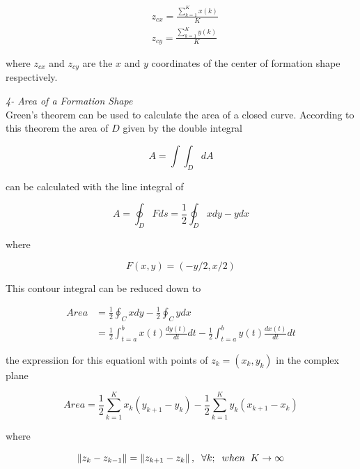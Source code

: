 \begin{align*}
&z_{cx} = \frac{\sum_{k=1}^{K}x(k)}{K}  \\
&z_{cy} = \frac{\sum_{k=1}^{K}y(k)}{K}  
\end{align*}
		
where $z_{cx}$ and $z_{cy}$ are the $x$ and $y$ coordinates of the center of formation shape respectively.

\textit{ 	4- Area of a Formation Shape} \\ 		
Green's theorem can be used to calculate the area of a closed curve. According to this theorem the area of $D$ given by the double integral

\begin{equation}
 A = \int\int_D dA
\end{equation}
		
can be calculated with the line integral of

\begin{equation}
 A = \oint_D F ds = \frac{1}{2} \oint_D xdy - ydx
\end{equation}

where

\begin{equation}
F(x,y) = (-y/2,x/2)
\end{equation}
		
This contour integral can be reduced down to

\begin{align*}
Area &= \frac{1}{2} \oint_C xdy - \frac{1}{2} \oint_C ydx \\
&= \frac{1}{2} \int_{t=a}^{b} x(t)\frac{dy(t)}{dt}dt - \frac{1}{2} \int_{t=a}^{b}y(t)\frac{dx(t)}{dt}dt
\end{align*}
		
the expressiion for this equationl with points of  $z_k = (x_k,y_k)$ in the complex plane
			
\begin{equation}
Area = \frac{1}{2} \sum_{k=1}^{K} x_k(y_{k+1} - y_k) - \frac{1}{2} \sum_{k=1}^{K}y_k(x_{k+1} - x_k)
\end{equation}
			
where

\begin{equation}
\left\lVert z_k - z_{k-1}\right\rVert = \left\lVert z_{k+1} - z_k\right\rVert, \hspace{0.2cm}  \forall k ;  \hspace{0.2cm} when  \hspace{0.2cm} K \to\infty
\end{equation}

